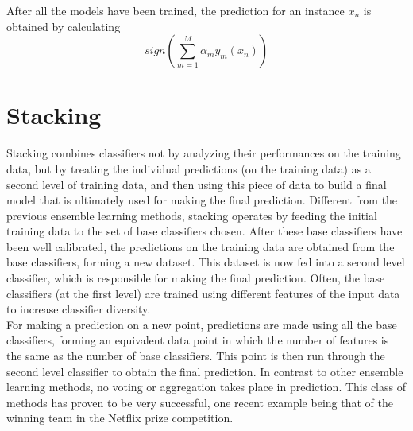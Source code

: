 After all the models have been trained, the prediction for an instance $x_n$ is obtained by calculating $$sign(\displaystyle \sum_{m = 1}^{M} \alpha_m y_m(x_n))$$

\section{Stacking}
Stacking combines classifiers not by analyzing their performances on the training data, but by treating the individual predictions (on the training data) as a second level of training data, and then using this piece of data to build a final model that is ultimately used for making the final prediction. Different from the previous ensemble learning methods, stacking operates by feeding the initial training data to the set of base classifiers chosen. After these base classifiers have been well calibrated, the predictions on the training data are obtained from the base classifiers, forming a new dataset. This dataset is now fed into a second level classifier, which is responsible for making the final prediction. Often, the base classifiers (at the first level) are trained using different features of the input data to increase classifier diversity.\\

For making a prediction on a new point, predictions are made using all the base classifiers, forming an equivalent data point in which the number of features is the same as the number of base classifiers. This point is then run through the second level classifier to obtain the final prediction. In contrast to other ensemble learning methods, no voting or aggregation takes place in prediction. This class of methods has proven to be very successful, one recent example being that of the winning team in the Netflix prize competition.
